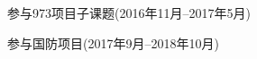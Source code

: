 
\begin{projects}{99}
    \item 参与973项目子课题(2016年11月--2017年5月)
    \item 参与国防项目(2017年9月--2018年10月)
\end{projects}
